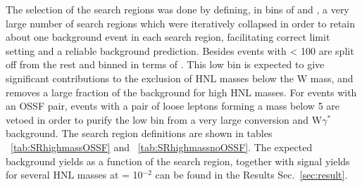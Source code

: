 The selection of the search regions was done by defining, in bins of \mtmin and \mmin, a very large number of search regions which were iteratively collapsed in order to retain about one background event in each search region, facilitating correct limit setting and a reliable background prediction. Besides events with \mlll < 100 \GeV are split off from the rest and binned in terms of \mtmin. This low \mlll bin is expected to give significant contributions to the exclusion of HNL masses below the W mass, and removes a large fraction of the background for high HNL masses. For events with an OSSF pair, events with a pair of loose leptons forming a mass below 5 \GeV are vetoed in order to purify the low \mlll bin from a very large conversion and W$\gamma^{*}$ background. The search region definitions are shown in tables ~\ref{tab:SRhighmassOSSF} and ~\ref{tab:SRhighmassnoOSSF}. The expected background yields as a function of the search region, together with signal yields for several HNL masses at \mixpar = 10$^{-2}$ can be found in the Results Sec.~\ref{sec:result}.


\begin{table}[h]
\centering
{\small
\caption{Search regions for events with an OSSF pair in the high mass category.}
\label{tab:SRhighmassOSSF}
}
\end{table}

